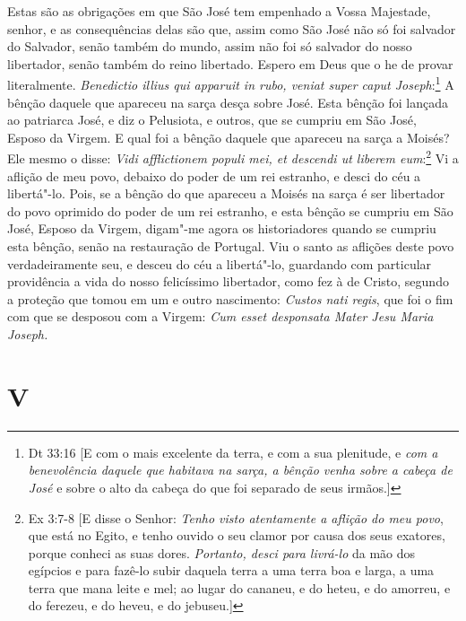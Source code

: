 Estas são as obrigações em que São José tem empenhado a Vossa Majestade,
senhor, e as consequências delas são que, assim como São José não só foi
salvador do Salvador, senão também do mundo, assim não foi só salvador
do nosso libertador, senão também do reino libertado. Espero em Deus que
o he de provar literalmente. \emph{Benedictio illius qui apparuit in
rubo, veniat super caput Joseph}:\footnote{Dt 33:16 [E com o mais excelente da terra, e com a sua plenitude, e \textit{com a benevolência daquele que habitava na sarça, a bênção venha sobre a cabeça de José} e sobre o alto da cabeça do que foi separado de seus irmãos.]} A bênção daquele que
apareceu na sarça desça sobre José. Esta bênção foi lançada ao
patriarca José, e diz o Pelusiota, e outros, que se cumpriu em São José,
Esposo da Virgem. E qual foi a bênção daquele que apareceu na sarça a
Moisés? Ele mesmo o disse: \emph{Vidi afflictionem populi mei, et
descendi ut liberem eum}:\footnote{Ex 3:7-8 [E disse o Senhor: \textit{Tenho visto atentamente a aflição do meu povo}, que está no Egito, e tenho ouvido o seu clamor por causa dos seus exatores, porque conheci as suas dores. \textit{Portanto, desci para livrá-lo} da mão dos egípcios e para fazê-lo subir daquela terra a uma terra boa e larga, a uma terra que mana leite e mel; ao lugar do cananeu, e do heteu, e do amorreu, e do ferezeu, e do heveu, e do jebuseu.]} Vi a aflição de meu povo, debaixo
do poder de um rei estranho, e desci do céu a libertá"-lo. Pois, se a
bênção do que apareceu a Moisés na sarça é ser libertador do povo
oprimido do poder de um rei estranho, e esta bênção se cumpriu em São
José, Esposo da Virgem, digam"-me agora os historiadores quando se
cumpriu esta bênção, senão na restauração de Portugal. Viu o santo as
aflições deste povo verdadeiramente seu, e desceu do céu a libertá"-lo,
guardando com particular providência a vida do nosso felicíssimo
libertador, como fez à de Cristo, segundo a proteção que tomou em um e
outro nascimento: \emph{Custos nati regis}, que foi o fim com que se
desposou com a Virgem: \emph{Cum esset desponsata Mater Jesu Maria
Joseph.}

\section*{V}

